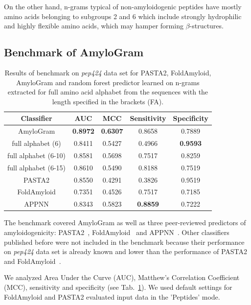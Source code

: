 \documentclass[a4,center,fleqn]{NAR}
\begin{document}
On the other hand, n-grams typical of non-amyloidogenic peptides have mostly amino acids 
belonging to subgroups 2 and 6 which include strongly hydrophilic and highly flexible amino acids, which may hamper forming $\beta$-structures.

\subsection{Benchmark of AmyloGram}

\begin{table}[ht]
\centering
\small
\caption{Results of benchmark on \textit{pep424} data set for PASTA2, 
FoldAmyloid, AmyloGram and random forest predictor learned on n-grams extracted 
for full amino acid alphabet from the sequences with the length specified in 
the brackets (FA).} 
\label{tab:bench_summary}
\begin{tabular}{ccccc}
  \toprule
Classifier & AUC & MCC & Sensitivity & Specificity \\ 
  \midrule
AmyloGram & \textbf{0.8972} & \textbf{0.6307} & 0.8658 & 0.7889 \\ 
   \rowcolor[gray]{0.85}full alphabet (6) & 0.8411 & 0.5427 & 0.4966 & 
\textbf{0.9593} \\ 
  full alphabet (6-10) & 0.8581 & 0.5698 & 0.7517 & 0.8259 \\ 
   \rowcolor[gray]{0.85}full alphabet (6-15) & 0.8610 & 0.5490 & 0.8188 & 
0.7519 \\ 
\hline \hline
  PASTA2 & 0.8550 & 0.4291 & 0.3826 & 0.9519 \\ 
   \rowcolor[gray]{0.85}FoldAmyloid & 0.7351 & 0.4526 & 0.7517 & 0.7185 \\ 
  APPNN & 0.8343 & 0.5823 & \textbf{0.8859} & 0.7222 \\ 
   \bottomrule
\end{tabular}
\end{table}

The benchmark covered AmyloGram as well as three peer-reviewed predictors of 
amyloidogenicity: PASTA2~\citep{walsh_pasta_2014}, 
FoldAmyloid~\citep{garbuzynskiy_foldamyloid:_2010} and 
APPNN~\citep{familia_prediction_2015}. Other classifiers published before were 
not included in the benchmark because their performance on \textit{pep424} 
data set is already known and lower than the performance of PASTA2 and 
FoldAmyloid~\citep{walsh_pasta_2014}.

  We analyzed Area Under the Curve (AUC), Matthew's Correlation Coefficient 
(MCC), sensitivity and specificity (see Tab.~\ref{tab:bench_summary}). We used 
default settings for FoldAmyloid and PASTA2 evaluated input data in the 
'Peptides' mode.
\end{document}
